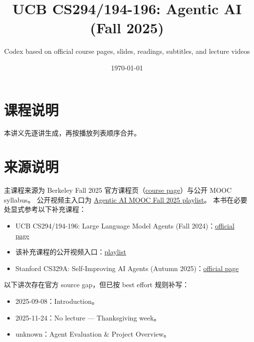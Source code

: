 \documentclass[a4paper]{article}
\title{UCB CS294/194-196: Agentic AI (Fall 2025)}
\author{Codex based on official course pages, slides, readings, subtitles, and lecture videos}
\date{\today}
\begin{document}
\maketitle
\tableofcontents
\newpage
\section*{课程说明}
本讲义先逐讲生成，再按播放列表顺序合并。
\section*{来源说明}
主课程来源为 Berkeley Fall 2025 官方课程页（\href{https://rdi.berkeley.edu/agentic-ai/f25}{course page}）与公开 MOOC syllabus。
公开视频主入口为 \href{https://www.youtube.com/playlist?list=PLS01nW3RtgoqGkm4UeqNeZLccW-OGc1fJ}{Agentic AI MOOC Fall 2025 playlist}。
本书在必要处显式参考以下补充课程：
\begin{itemize}
\item UCB CS294/194-196: Large Language Model Agents (Fall 2024)：\href{https://rdi.berkeley.edu/llm-agents/f24}{official page}
\item 该补充课程的公开视频入口：\href{https://www.youtube.com/playlist?list=PLS01nW3RtgopsNLeM936V4TNSsvvVglLc}{playlist}
\item Stanford CS329A: Self-Improving AI Agents (Autumn 2025)：\href{https://cs329a.stanford.edu/}{official page}
\end{itemize}
以下讲次存在官方 source gap，但已按 best effort 规则补写：
\begin{itemize}
\item 2025-09-08：Introduction。
\item 2025-11-24：No lecture — Thanksgiving week。
\item unknown：Agent Evaluation \& Project Overview。
\end{itemize}
\end{document}
